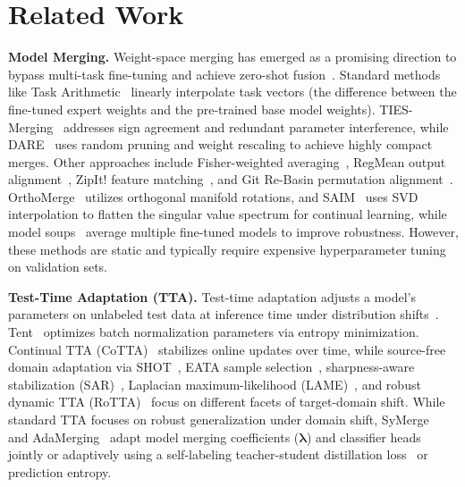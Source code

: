 \documentclass{article}
\theoremstyle{plain}
\theoremstyle{definition}
\theoremstyle{remark}
\begin{document}
\section{Related Work}
\label{sec:related}

\textbf{Model Merging.}
Weight-space merging has emerged as a promising direction to bypass multi-task fine-tuning and achieve zero-shot fusion~\cite{chhanabhai2024survey, yang2026ModelMergingSurvey}. Standard methods like Task Arithmetic~\cite{ilharco2023editing} linearly interpolate task vectors (the difference between the fine-tuned expert weights and the pre-trained base model weights). TIES-Merging~\cite{yadav2023ties} addresses sign agreement and redundant parameter interference, while DARE~\cite{yu2024dare} uses random pruning and weight rescaling to achieve highly compact merges. Other approaches include Fisher-weighted averaging~\cite{matena2022merging}, RegMean output alignment~\cite{jin2023dataless}, ZipIt! feature matching~\cite{stoica2024zipit}, and Git Re-Basin permutation alignment~\cite{ainsworth2023git}. OrthoMerge~\cite{orthomerge} utilizes orthogonal manifold rotations, and SAIM~\cite{saim} uses SVD interpolation to flatten the singular value spectrum for continual learning, while model soups~\cite{wortsman2022robust} average multiple fine-tuned models to improve robustness. However, these methods are static and typically require expensive hyperparameter tuning on validation sets.

\textbf{Test-Time Adaptation (TTA).}
Test-time adaptation adjusts a model's parameters on unlabeled test data at inference time under distribution shifts~\cite{liang2024comprehensive, xiao2024beyond, yuan2023search, zhao2023pitfalls}. Tent~\cite{wang2020tent} optimizes batch normalization parameters via entropy minimization. Continual TTA (CoTTA)~\cite{wang2022continual} stabilizes online updates over time, while source-free domain adaptation via SHOT~\cite{liang2020do}, EATA sample selection~\cite{niu2022efficient}, sharpness-aware stabilization (SAR)~\cite{niu2023towards}, Laplacian maximum-likelihood (LAME)~\cite{boudiaf2022parameter}, and robust dynamic TTA (RoTTA)~\cite{yuan2023robust} focus on different facets of target-domain shift. While standard TTA focuses on robust generalization under domain shift, SyMerge~\cite{symerge} and AdaMerging~\cite{yang2024adamerging} adapt model merging coefficients ($\boldsymbol{\lambda}$) and classifier heads jointly or adaptively using a self-labeling teacher-student distillation loss~\cite{hinton2015distilling} or prediction entropy.
\end{document}
